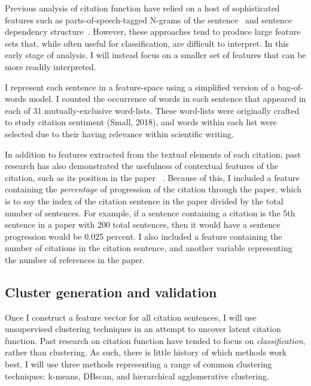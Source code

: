 \documentclass[
10pt, %
a4paper, %
oneside, %
headinclude,footinclude, %
BCOR5mm, %
]{scrartcl}
\begin{document}
Previous analysis of citation function have relied on a host of sophisticated features such as parts-of-speech-tagged N-grams of the sentence~\cite{teufel_automatic_2006, athar_sentiment_2011, li_towards_2013, valenzuela_identifying_2015} and sentence dependency structure~\cite{athar_context-enhanced_2012, li_towards_2013, jha_nlp-driven_2017}. However, these approaches tend to produce large feature sets that, while often useful for classification, are difficult to interpret. In this early stage of analysis, I will instead focus on a smaller set of features that can be more readily interpreted.  

I represent each sentence in a feature-space using a simplified version of a bag-of-words model. I counted the occurrence of words in each sentence that appeared in each of 31 mutually-exclusive word-lists. These word-lists were originally crafted to study citation sentiment (Small, 2018), and words within each list were selected due to their having relevance within scientific writing. 

In addition to features extracted from the textual elements of each citation, past research has also demonstrated the usefulness of contextual features of the citation, such as its position in the paper ~\cite{teufel_automatic_2006, valenzuela_identifying_2015, jha_nlp-driven_2017}. Because of this, I included a feature containing the \textit{percentage} of progression of the citation through the paper, which is to say the index of the citation sentence in the paper divided by the total number of sentences. For example, if a sentence containing a citation is the 5th sentence in a paper with 200 total sentences, then it would have a sentence progression would be 0.025 percent. I also included a feature containing the number of citations in the citation sentence, and another variable representing the number of references in the paper. 

\subsection{Cluster generation and validation}
\label{subsec:approach}
Once I construct a feature vector for all citation sentences, I will use unsupervised clustering techniques in an attempt to uncover latent citation function. Past research on citation function have tended to focus on \textit{classification}, rather than clustering. As such, there is little history of which methods work best. I will use three methods representing a range of common clustering techniques: k-means, DBscan, and hierarchical agglomerative clustering. 
\end{document}
